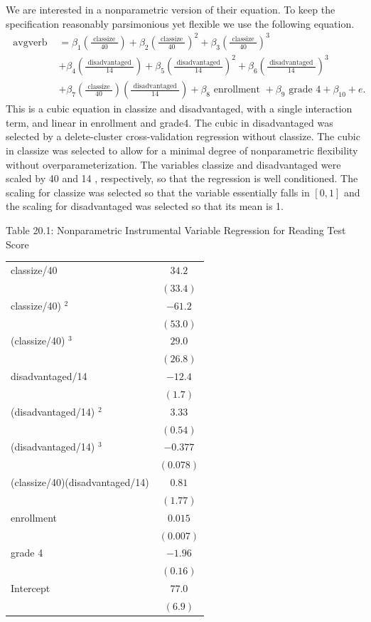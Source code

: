 \documentclass[10pt]{article}
\begin{document}
We are interested in a nonparametric version of their equation. To keep the specification reasonably parsimonious yet flexible we use the following equation.
$$
\begin{aligned}
\text { avgverb } &=\beta_{1}\left(\frac{\text { classize }}{40}\right)+\beta_{2}\left(\frac{\text { classize }}{40}\right)^{2}+\beta_{3}\left(\frac{\text { classize }}{40}\right)^{3} \\
&+\beta_{4}\left(\frac{\text { disadvantaged }}{14}\right)+\beta_{5}\left(\frac{\text { disadvantaged }}{14}\right)^{2}+\beta_{6}\left(\frac{\text { disadvantaged }}{14}\right)^{3} \\
&+\beta_{7}\left(\frac{\text { classize }}{40}\right)\left(\frac{\text { disadvantaged }}{14}\right)+\beta_{8} \text { enrollment }+\beta_{9} \text { grade } 4+\beta_{10}+e .
\end{aligned}
$$
This is a cubic equation in classize and disadvantaged, with a single interaction term, and linear in enrollment and grade4. The cubic in disadvantaged was selected by a delete-cluster cross-validation regression without classize. The cubic in classize was selected to allow for a minimal degree of nonparametric flexibility without overparameterization. The variables classize and disadvantaged were scaled by 40 and 14 , respectively, so that the regression is well conditioned. The scaling for classize was selected so that the variable essentially falls in $[0,1]$ and the scaling for disadvantaged was selected so that its mean is 1.

Table 20.1: Nonparametric Instrumental Variable Regression for Reading Test Score

\begin{tabular}{lc}
classize/40 & $34.2$ \\
 & $(33.4)$ \\
classize/40) $^{2}$ & $-61.2$ \\
 & $(53.0)$ \\
(classize/40) $^{3}$ & $29.0$ \\
 & $(26.8)$ \\
disadvantaged/14 & $-12.4$ \\
 & $(1.7)$ \\
(disadvantaged/14) $^{2}$ & $3.33$ \\
 & $(0.54)$ \\
(disadvantaged/14) $^{3}$ & $-0.377$ \\
 & $(0.078)$ \\
(classize/40)(disadvantaged/14) & $0.81$ \\
 & $(1.77)$ \\
enrollment & $0.015$ \\
 & $(0.007)$ \\
grade 4 & $-1.96$ \\
 & $(0.16)$ \\
Intercept & $77.0$ \\
 & $(6.9)$ \\
\hline
\end{tabular}
\end{document}
